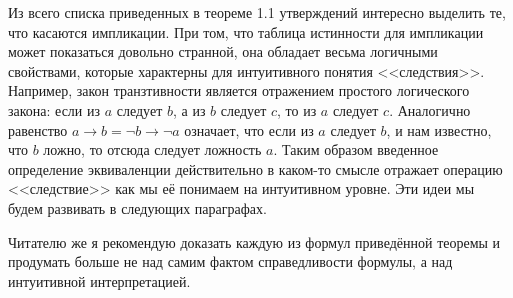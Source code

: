 Из всего списка приведенных в теореме 1.1 утверждений интересно выделить те, что касаются импликации. При том, что таблица истинности для импликации может показаться довольно странной,  она обладает весьма логичными свойствами, которые характерны для интуитивного понятия <<следствия>>. Например, закон транзтивности является отражением простого логического закона: если из $a$ следует $b$, а из $b$ следует $c$, то из $a$ следует $c$. Аналогично равенство $a \rightarrow b = \neg b \rightarrow \neg a$ означает, что если из $a$ следует $b$, и нам известно, что $b$ ложно, то отсюда следует ложность $a$. Таким образом введенное определение эквиваленции действительно в каком-то смысле отражает операцию <<следствие>> как мы её понимаем на интуитивном уровне. Эти идеи мы будем развивать в следующих параграфах.

Читателю же я рекомендую доказать каждую из формул приведённой теоремы и продумать больше не над самим фактом справедливости формулы, а над интуитивной интерпретацией.


